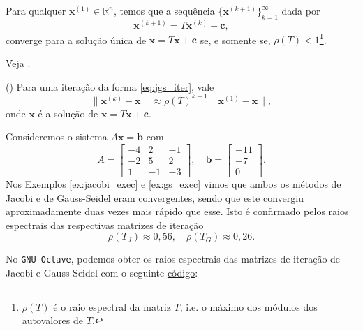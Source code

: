 \begin{teo}
  Para qualquer $\pmb{x}^{(1)}\in\mathbb{R}^n$, temos que a sequência $\{\pmb{x}^{(k+1)}\}_{k=1}^{\infty}$ dada por
  \begin{equation}
    \pmb{x}^{(k+1)} = T\pmb{x}^{(k)} + \pmb{c},
  \end{equation}
  converge para a solução única de $\pmb{x} = T\pmb{x} + \pmb{c}$ se, e somente se, $\rho(T) < 1$\footnote{$\rho(T)$ é o raio espectral da matriz $T$, i.e. o máximo dos módulos dos autovalores de $T$.}.
\end{teo}
\begin{dem}
  Veja \cite[Cap. 7, Sec. 7.3]{Burden2015a}.
\end{dem}

\begin{obs}()
  Para uma iteração da forma \eqref{eq:jgs_iter}, vale
  \begin{equation}
    \|\pmb{x}^{(k)}-\pmb{x}\| \approx \rho(T)^{k-1}\|\pmb{x}^{(1)}-\pmb{x}\|,
  \end{equation}
onde $\pmb{x}$ é a solução de $\pmb{x} = T\pmb{x} + \pmb{c}$.
\end{obs}

\begin{ex}\label{ex:jacobi_exec}
  Consideremos o sistema $A\pmb{x} = \pmb{b}$ com
  \begin{equation}
    A =
    \begin{bmatrix}
      -4 & 2 & -1 \\
      -2 & 5 & 2 \\
       1 & -1 & -3
    \end{bmatrix},\quad
    \pmb{b} =
    \begin{bmatrix}
      -11\\ -7\\ 0
    \end{bmatrix}.
  \end{equation}
  Nos Exemplos \ref{ex:jacobi_exec} e \ref{ex:gs_exec} vimos que ambos os métodos de Jacobi e de Gauss-Seidel eram convergentes, sendo que este convergiu aproximadamente duas vezes mais rápido que esse. Isto é confirmado pelos raios espectrais das respectivas matrizes de iteração
  \begin{equation}
    \rho(T_J) \approx 0,56,\quad\rho(T_G) \approx 0,26.
  \end{equation}

\ifisoctave
No \verb+GNU Octave+, podemos obter os raios espectrais das matrizes de iteração de Jacobi e Gauss-Seidel com o seguinte \href{https://github.com/phkonzen/notas/blob/master/src/MatematicaNumerica/cap_sl_iter/dados/ex_jgs_conv/ex_jgs_conv.m}{código}:

\fi
\end{ex}

